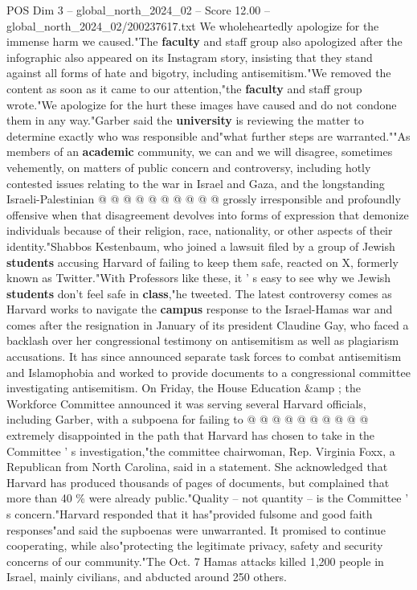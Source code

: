 \begin{textsample}{POS Dim 3 – global\_north\_2024\_02 – Score 12.00 – global\_north\_2024\_02/200237617.txt}
We wholeheartedly apologize for the immense harm we caused."The \textbf{faculty} and staff group also apologized after the infographic also appeared on its Instagram story, insisting that they stand against all forms of hate and bigotry, including antisemitism."We removed the content as soon as it came to our attention,"the \textbf{faculty} and staff group wrote."We apologize for the hurt these images have caused and do not condone them in any way."Garber said the \textbf{university} is reviewing the matter to determine exactly who was responsible and"what further steps are warranted.""As members of an \textbf{academic} community, we can and we will disagree, sometimes vehemently, on matters of public concern and controversy, including hotly contested issues relating to the war in Israel and Gaza, and the longstanding Israeli-Palestinian @ @ @ @ @ @ @ @ @ @ grossly irresponsible and profoundly offensive when that disagreement devolves into forms of expression that demonize individuals because of their religion, race, nationality, or other aspects of their identity."Shabbos Kestenbaum, who joined a lawsuit filed by a group of Jewish \textbf{students} accusing Harvard of failing to keep them safe, reacted on X, formerly known as Twitter."With Professors like these, it ' s easy to see why we Jewish \textbf{students} don't feel safe in \textbf{class},"he tweeted.
The latest controversy comes as Harvard works to navigate the \textbf{campus} response to the Israel-Hamas war and comes after the resignation in January of its president Claudine Gay, who faced a backlash over her congressional testimony on antisemitism as well as plagiarism accusations.
It has since announced separate task forces to combat antisemitism and Islamophobia and worked to provide documents to a congressional committee investigating antisemitism.
On Friday, the House Education \&amp ; the Workforce Committee announced it was serving several Harvard officials, including Garber, with a subpoena for failing to @ @ @ @ @ @ @ @ @ @ extremely disappointed in the path that Harvard has chosen to take in the Committee ' s investigation,"the committee chairwoman, Rep.
Virginia Foxx, a Republican from North Carolina, said in a statement.
She acknowledged that Harvard has produced thousands of pages of documents, but complained that more than 40 \% were already public."Quality -- not quantity -- is the Committee ' s concern."Harvard responded that it has"provided fulsome and good faith responses"and said the supboenas were unwarranted.
It promised to continue cooperating, while also"protecting the legitimate privacy, safety and security concerns of our community."The Oct. 7 Hamas attacks killed 1,200 people in Israel, mainly civilians, and abducted around 250 others.

\end{textsample}
